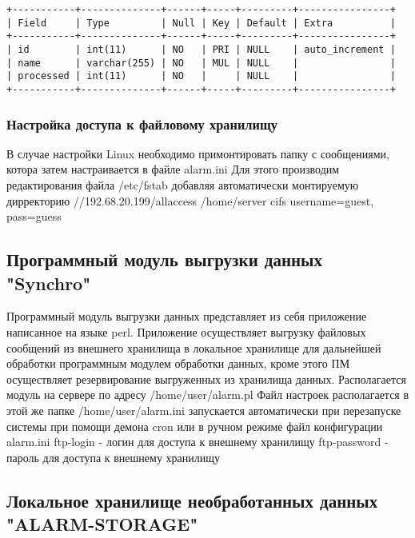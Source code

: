 \documentclass[12pt]{article}[a4paper,14pt,russian]
\begin{document}
\begin{verbatim}
+-----------+--------------+------+-----+---------+----------------+
| Field     | Type         | Null | Key | Default | Extra          |
+-----------+--------------+------+-----+---------+----------------+
| id        | int(11)      | NO   | PRI | NULL    | auto_increment |
| name      | varchar(255) | NO   | MUL | NULL    |                |
| processed | int(11)      | NO   |     | NULL    |                |
+-----------+--------------+------+-----+---------+----------------+

\end{verbatim}
	\subsubsection{Настройка доступа к файловому хранилищу}
	В случае настройки Linux необходимо примонтировать папку с сообщениями, котора затем настраивается в файле alarm.ini
	Для этого производим редактирования файла /etc/fstab добавляя автоматически монтируемую дирректорию
	//192.68.20.199/allaccess /home/server cifs username=guest, pass=guess
	\subsection{Программный модуль выгрузки данных "Synchro"}
	Программный модуль выгрузки данных представляет из себя приложение написанное на языке perl. Приложение осуществляет выгрузку файловых сообщений из внешнего хранилища в локальное хранилище для дальнейшей обработки программным модулем обработки данных, кроме этого ПМ осуществляет резервирование выгруженных из хранилища данных.
	Располагается модуль на сервере по адресу
	/home/user/alarm.pl
	Файл настроек располагается в этой же папке 
	/home/user/alarm.ini
	запускается автоматически при перезапуске системы при помощи демона cron или в ручном режиме
	 \newline
    \newline
   файл конфигурации alarm.ini
    ftp-login - логин для доступа к внешнему хранилищу
    ftp-password - пароль для доступа к внешнему хранилищу
	\subsection{Локальное хранилище необработанных данных "ALARM-STORAGE"}
\end{document}

